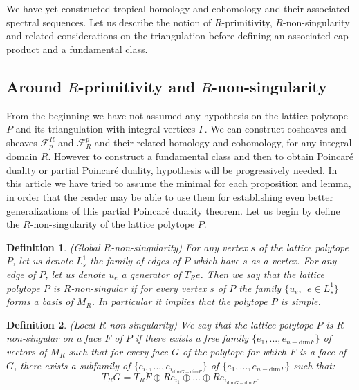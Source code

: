 \documentclass{article}
\newtheorem{definition}{Definition}
\begin{document}
We have yet constructed tropical homology and cohomology and their associated spectral sequences. Let us describe the notion of $R$-primitivity, $R$-non-singularity and related considerations on the triangulation before defining an associated cap-product and a fundamental class.

\subsection{Around $R$-primitivity and $R$-non-singularity}

\label{secprim}

From the beginning we have not assumed any hypothesis on the lattice polytope $P$ and its triangulation with integral vertices $\Gamma$. We can construct cosheaves and sheaves $\mathcal{F}_p^R$ and $\mathcal{F}^p_R$ and their related homology and cohomology, for any integral domain $R$. However to construct a fundamental class and then to obtain Poincaré duality or partial Poincaré duality, hypothesis will be progressively needed. In this article we have tried to assume the minimal for each proposition and lemma, in order that the reader may be able to use them for establishing even better generalizations of this partial Poincaré duality theorem. Let us begin by define the $R$-non-singularity of the lattice polytope $P$.

\begin{definition}
    (Global $R$-non-singularity) For any vertex $s$ of the lattice polytope $P$, let us denote $L^1_s$ the family of edges of $P$ which have $s$ as a vertex. For any edge of $P$, let us denote $u_e$ a generator of $T_Re$. Then we say that the lattice polytope $P$ is $R$-non-singular if for every vertex $s$ of $P$ the family $\{u_e,~~e \in L^1_s\}$ forms a basis of $M_R$. In particular it implies that the polytope $P$ is simple.

    \label{prim}
\end{definition}

\begin{definition}
    (Local $R$-non-singularity) We say that the lattice polytope $P$ is $R$-non-singular on a face $F$ of $P$ if there exists a free family $\{e_1,...,e_{n-\mathrm{dim}F}\}$ of vectors of $M_R$ such that for every face $G$ of the polytope for which $F$ is a face of $G$, there exists a subfamily of $\{e_{i_1},...,e_{i_{\mathrm{dim}G-\mathrm{dim}F}}\}$ of $\{e_1,...,e_{n-\mathrm{dim}F}\}$ such that:
    \begin{equation*}
        T_RG=T_RF\oplus Re_{i_1}\oplus...\oplus Re_{i_{\mathrm{dim}G-\mathrm{dim}F}}.
    \end{equation*}
    \label{locprim}
\end{definition}
\end{document}
